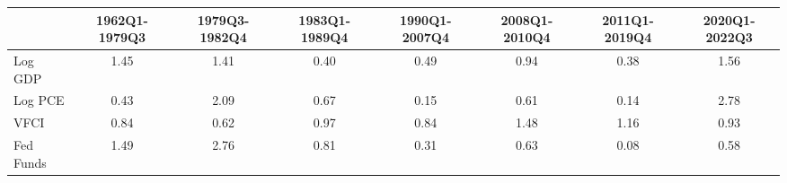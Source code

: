 \begin{table}[ht]
\centering
\begin{tabular}{lccccccc}
  \hline
 & 1962Q1-1979Q3 & 1979Q3-1982Q4 & 1983Q1-1989Q4 & 1990Q1-2007Q4 & 2008Q1-2010Q4 & 2011Q1-2019Q4 & 2020Q1-2022Q3 \\ 
  \hline
Log GDP & 1.45 & 1.41 & 0.40 & 0.49 & 0.94 & 0.38 & 1.56 \\ 
  Log PCE & 0.43 & 2.09 & 0.67 & 0.15 & 0.61 & 0.14 & 2.78 \\ 
  VFCI & 0.84 & 0.62 & 0.97 & 0.84 & 1.48 & 1.16 & 0.93 \\ 
  Fed Funds & 1.49 & 2.76 & 0.81 & 0.31 & 0.63 & 0.08 & 0.58 \\ 
   \hline
\end{tabular}
\end{table}
